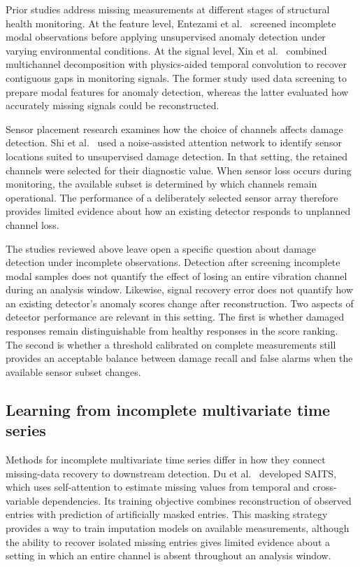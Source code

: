 \documentclass[a4paper,fleqn]{cas-sc}
\begin{document}
Prior studies address missing measurements at different stages of structural health monitoring. At the feature level, Entezami et al.\ \cite{entezami2023meta} screened incomplete modal observations before applying unsupervised anomaly detection under varying environmental conditions. At the signal level, Xin et al.\ \cite{xin2025recovery} combined multichannel decomposition with physics-aided temporal convolution to recover contiguous gaps in monitoring signals. The former study used data screening to prepare modal features for anomaly detection, whereas the latter evaluated how accurately missing signals could be reconstructed.

Sensor placement research examines how the choice of channels affects damage detection. Shi et al.\ \cite{shi2024sensor} used a noise-assisted attention network to identify sensor locations suited to unsupervised damage detection. In that setting, the retained channels were selected for their diagnostic value. When sensor loss occurs during monitoring, the available subset is determined by which channels remain operational. The performance of a deliberately selected sensor array therefore provides limited evidence about how an existing detector responds to unplanned channel loss.

The studies reviewed above leave open a specific question about damage detection under incomplete observations. Detection after screening incomplete modal samples does not quantify the effect of losing an entire vibration channel during an analysis window. Likewise, signal recovery error does not quantify how an existing detector's anomaly scores change after reconstruction. Two aspects of detector performance are relevant in this setting. The first is whether damaged responses remain distinguishable from healthy responses in the score ranking. The second is whether a threshold calibrated on complete measurements still provides an acceptable balance between damage recall and false alarms when the available sensor subset changes.
\subsection{Learning from incomplete multivariate time series}
\label{subsec:incomplete-mts}

Methods for incomplete multivariate time series differ in how they connect missing-data recovery to downstream detection. Du et al.\ \cite{du2023saits} developed SAITS, which uses self-attention to estimate missing values from temporal and cross-variable dependencies. Its training objective combines reconstruction of observed entries with prediction of artificially masked entries. This masking strategy provides a way to train imputation models on available measurements, although the ability to recover isolated missing entries gives limited evidence about a setting in which an entire channel is absent throughout an analysis window.
\end{document}
